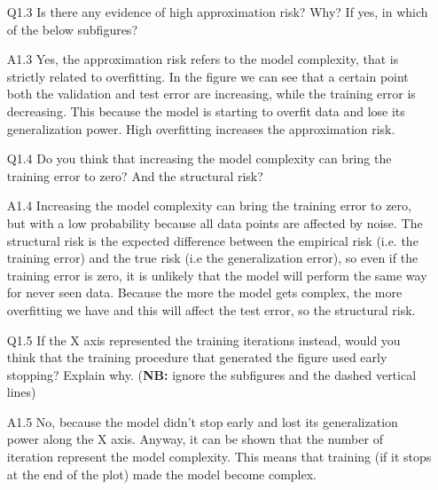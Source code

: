 \documentclass[11pt]{scrartcl}
\begin{document}
\begin{itemize}
\item[Q1.3] Is there any evidence of high approximation risk? Why? If yes, in which of the below subfigures?  
\item[A1.3] Yes, the approximation risk refers to the model complexity, that is strictly related to overfitting. In the figure we can see that a certain point both the validation and test error are increasing, while the training error is decreasing. This because the model is starting to overfit data and lose its generalization power. High overfitting increases the approximation risk.

\item[Q1.4] Do you think that increasing the model complexity can bring the training error to zero? And the structural risk?  
\item[A1.4] Increasing the model complexity can bring the training error to zero, but with a low probability because all data points are affected by noise. The structural risk is the expected difference between the empirical risk (i.e. the training error) and the true risk (i.e the generalization error), so even if the training error is zero, it is unlikely that the model will perform the same way for never seen data. Because the more the model gets complex, the more overfitting we have and this will affect the test error, so the structural risk.

\item[Q1.5] If the X axis represented the training iterations instead, would you think that the training procedure that generated the figure used early stopping? Explain why. (\textbf{NB:} ignore the subfigures and the dashed vertical lines)
\item[A1.5] No, because the model didn't stop early and lost its generalization power along the X axis. Anyway, it can be shown that the number of iteration represent the model complexity. This means that training (if it stops at the end of the plot) made the model become complex.

\end{itemize}
\end{document}
